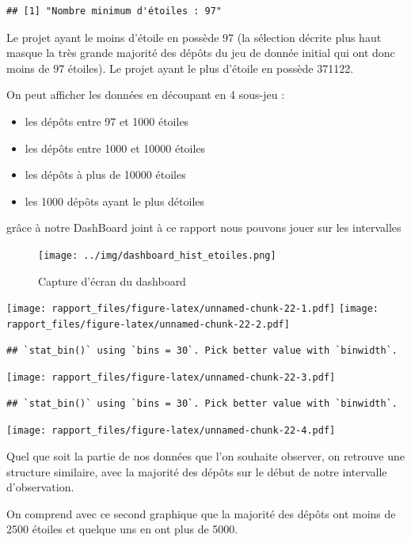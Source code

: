 \documentclass[
]{article}
\providecommand{\tightlist}{%
  \setlength{\itemsep}{0pt}\setlength{\parskip}{0pt}}
\begin{document}
\begin{verbatim}
## [1] "Nombre minimum d'étoiles : 97"
\end{verbatim}

Le projet ayant le moins d'étoile en possède 97 (la sélection décrite
plus haut masque la très grande majorité des dépôts du jeu de donnée
initial qui ont donc moins de 97 étoiles). Le projet ayant le plus
d'étoile en possède 371122.

On peut afficher les données en découpant en 4 sous-jeu :

\begin{itemize}
\tightlist
\item
  les dépôts entre 97 et 1000 étoiles
\item
  les dépôts entre 1000 et 10000 étoiles
\item
  les dépôts à plus de 10000 étoiles
\item
  les 1000 dépôts ayant le plus détoiles
\end{itemize}

grâce à notre DashBoard joint à ce rapport nous pouvons jouer sur les
intervalles

\begin{figure}
\centering
\texttt{[image: ../img/dashboard\_hist\_etoiles.png]}
\caption{Capture d'écran du dashboard}
\end{figure}

\texttt{[image: rapport\_files/figure-latex/unnamed-chunk-22-1.pdf]}
\texttt{[image: rapport\_files/figure-latex/unnamed-chunk-22-2.pdf]}

\begin{verbatim}
## `stat_bin()` using `bins = 30`. Pick better value with `binwidth`.
\end{verbatim}

\texttt{[image: rapport\_files/figure-latex/unnamed-chunk-22-3.pdf]}

\begin{verbatim}
## `stat_bin()` using `bins = 30`. Pick better value with `binwidth`.
\end{verbatim}

\texttt{[image: rapport\_files/figure-latex/unnamed-chunk-22-4.pdf]}

Quel que soit la partie de nos données que l'on souhaite observer, on
retrouve une structure similaire, avec la majorité des dépôts sur le
début de notre intervalle d'observation.

On comprend avec ce second graphique que la majorité des dépôts ont
moins de 2500 étoiles et quelque uns en ont plus de 5000.
\end{document}
